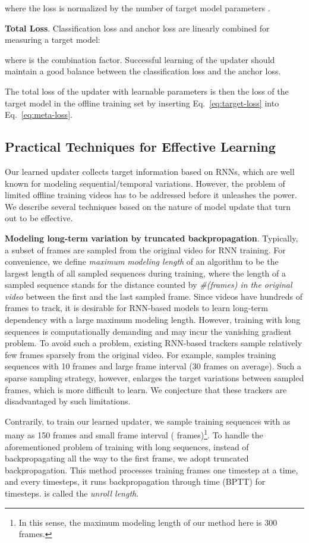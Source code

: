 \documentclass[journal]{IEEEtran}
\begin{document}
where the loss is normalized by the number of target model parameters .

\textbf{Total Loss}. Classification loss and anchor loss are linearly combined for measuring a target model: 

where  is the combination factor. Successful learning of the updater should maintain a good balance between the classification loss and the anchor loss.

The total loss of the updater  with learnable parameters  is then the loss of the target model in the offline training set by inserting Eq.~\ref{eq:target-loss} into Eq.~\ref{eq:meta-loss}.

\subsection{Practical Techniques for Effective Learning}\label{sec:effective-techniques}
Our learned updater collects target information based on RNNs, which are well known for modeling sequential/temporal variations. However, the problem of limited offline training videos has to be addressed before it unleashes the power. We describe several techniques based on the nature of model update that turn out to be effective.


\textbf{Modeling long-term variation by truncated backpropagation}. Typically, a subset of  frames are sampled from the original video for RNN training. For convenience, we define \emph{maximum modeling length} of an algorithm to be the largest length of all sampled sequences during training, where the length of a sampled sequence stands for the distance counted by \emph{\#(frames) in the original video} between the first and the last sampled frame. Since videos have hundreds of frames to track, it is desirable for RNN-based models to learn long-term dependency with a large maximum modeling length. However, training with long sequences is computationally demanding and may incur the vanishing gradient problem. To avoid such a problem, existing RNN-based trackers sample relatively few frames sparsely from the original video. For example, \cite{yang2017recurrent} samples training sequences with 10 frames and large frame interval (30 frames on average). Such a sparse sampling strategy, however, enlarges the target variations between sampled frames, which is more difficult to learn. We conjecture that these trackers are disadvantaged by such limitations. 

Contrarily, to train our learned updater, we sample training sequences with as many as 150 frames and small frame interval ( frames)\footnote{In this sense, the maximum modeling length of our method here is 300 frames.}. To handle the aforementioned problem of training with long sequences, instead of backpropagating all the way to the first frame, we adopt truncated backpropagation. This method processes training frames one timestep at a time, and every  timesteps, it runs backpropagation through time (BPTT) for  timesteps.  is called the \emph{unroll length}.
\end{document}
